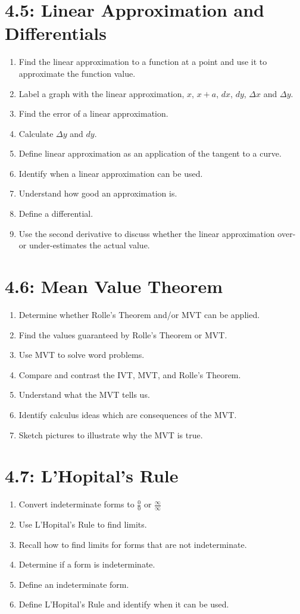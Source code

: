 \documentclass[11pt]{article}
\begin{document}
\section*{4.5: Linear Approximation and Differentials}
\begin{enumerate}
	\item Find the linear approximation to a function at a point and use it to approximate the function value.
	\item Label a graph with the linear approximation, $x$, $x+a$, $dx$, $dy$, $\Delta x$ and $\Delta y$.
	\item Find the error of a linear approximation.
	\item Calculate $\Delta y$ and $dy$.
	\item Define linear approximation as an application of the tangent to a curve.
	\item Identify when a linear approximation can be used.
	\item Understand how good an approximation is.
	\item Define a differential.
	\item Use the second derivative to discuss whether the linear approximation over- or under-estimates the actual value.
\end{enumerate}

\section*{4.6: Mean Value Theorem}
\begin{enumerate}
	\item Determine whether Rolle's Theorem and/or MVT can be applied.
	\item Find the values guaranteed by Rolle's Theorem or MVT.
	\item Use MVT to solve word problems.
	\item Compare and contrast the IVT, MVT, and Rolle's Theorem.
	\item Understand what the MVT tells us.
	\item Identify calculus ideas which are consequences of the MVT.
	\item Sketch pictures to illustrate why the MVT is true.
\end{enumerate}

\section*{4.7: L'Hopital's Rule}
\begin{enumerate}
	\item Convert indeterminate forms to $\frac{0}{0}$ or $\frac{\infty}{\infty}$
	\item Use L'Hopital's Rule to find limits.
	\item Recall how to find limits for forms that are not indeterminate.
	\item Determine if a form is indeterminate.
	\item Define an indeterminate form.
	\item Define L'Hopital's Rule and identify when it can be used.
\end{enumerate}
\end{document}
